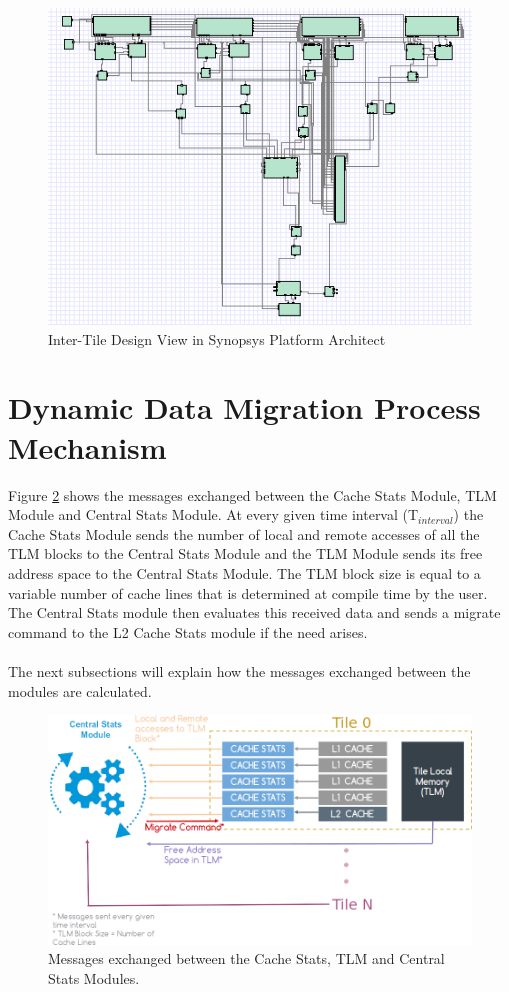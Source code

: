 \documentclass{listhesis}
\begin{document}
\begin{figure}
  \includegraphics[width=\linewidth]{processorsynopsys.png}
  \centering
  \caption{Inter-Tile Design View in Synopsys Platform Architect}
  \label{fig:processorsynopsys}
\end{figure}
\section{Dynamic Data Migration Process Mechanism}
Figure \ref{fig:approachOfSolution} shows the messages exchanged between the Cache Stats Module, TLM Module and Central Stats Module. At every given time interval (T$_{interval}$) the Cache Stats Module sends the number of local and remote accesses of all the TLM blocks to the Central Stats Module and the TLM Module sends its free address space to the Central Stats Module. The TLM block size is equal to a variable number of cache lines that is determined at compile time by the user. The Central Stats module then evaluates this received data and sends a migrate command to the L2 Cache Stats module if the need arises. \\
\\
The next subsections will explain how the messages exchanged between the modules are calculated. 
\begin{figure}
  \includegraphics[width=\linewidth]{approachOfSolution1.png}
  \centering
  \caption{Messages exchanged between the Cache Stats, TLM and Central Stats Modules.}
  \label{fig:approachOfSolution}
\end{figure}
\end{document}
